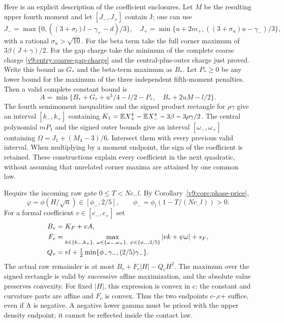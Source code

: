 Here is an explicit description of the coefficient enclosures. Let
$M$ be the resulting upper fourth moment and let $[J_-,J_+]$ contain J;
one can use
\[
 J_- =\max\{0,((3+\sigma_l)l-\gamma_+-d)/3\},\quad
 J_+=\min\{u+2m_+,((3+\sigma_u)u-\gamma_-)/3\},
\]
with a rational $\sigma_u>\sqrt{10}$. For the beta term take the full
corner maximum of $3\beta(J+\gamma)/2$. For the gap charge take the
minimum of the complete coarse charge
\eqref{v9:entry:coarse-gap-charge} and the central-plus-outer charge
just proved. Write this bound as $G_*$ and the beta-term maximum as $B_*$.
Let $P_*\ge0$ be any lower bound for the maximum of the three independent
fifth-moment penalties. Then a valid complete constant bound is
\begin{equation}\label{v9:entry:signed-constant}
 A=\min\{B_*+G_*+u^3/4-l/2-P_*,\quad B_*+2uM-l/2\}.
\end{equation}
The fourth semimoment inequalities and the signed product rectangle
for $\rho\gamma$ give an interval $[k_-,k_+]$ containing
$K_1=\mathbb E X_+^4-\mathbb E X_-^4-3\beta-3\rho\gamma/2$.
The central polynomial $mP_1$ and the signed outer bounds give an
interval $[\omega_-,\omega_+]$ containing
$\Omega=J_1+(M_4-3)/6$. Intersect them with every previous valid interval.
When multiplying by a moment endpoint, the sign of the coefficient is
retained. These constructions explain every coefficient in the next
quadratic, without assuming that unrelated corner maxima are attained
by one common law.

Require the incoming raw gate $0\le T<Nc_-l$. By
Corollary~\ref{v9:core:phase-price},
\[
 \varphi=\phi(H/\sqrt n)\in[\phi_-,2/5],\qquad
 \phi_- =\phi_l(1-T/(Nc_-l))>0.
\]
For a formal coefficient $v\in[c_-,c_+]$ set
\begin{align}
 B_v&=K_F+vA,\notag\\
 F_v&=\max_{k\in\{k_-,k_+\},\ \omega\in\{\omega_-,\omega_+\},\
                    \psi\in\{\phi_-,2/5\}}|vk+\psi\omega|+s_F,\notag\\
 Q_v&=vl+\tfrac12\min\{\phi_-\gamma_-,(2/5)\gamma_-\}.
 \label{v9:entry:signed-quadratic}
\end{align}
The actual raw remainder is at most $B_c+F_c|H|-Q_cH^2$.
The maximum over the signed rectangle is valid by successive affine
maximization, and the absolute value preserves convexity. For fixed
$|H|$, this expression is convex in c: the constant and curvature
parts are affine and $F_c$ is convex. Thus the two endpoints c-,c+
suffice, even if A is negative. A negative lower gamma must be priced
with the upper density endpoint; it cannot be reflected inside the
contact law.

